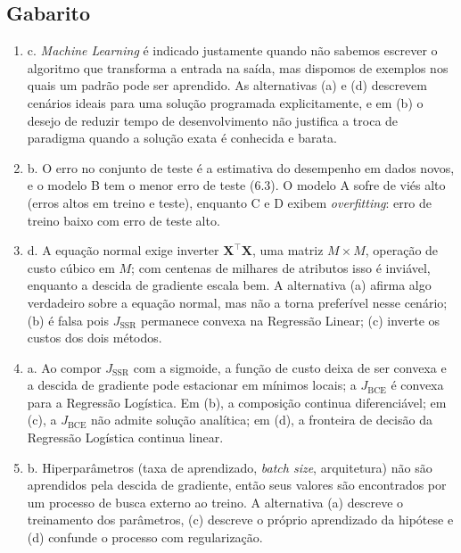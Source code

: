 \documentclass{dlproblemset}
\begin{document}
\subsection*{Gabarito}
\color{blue}
\begin{enumerate}[1)]

    \item c. \textit{Machine Learning} é indicado justamente quando não sabemos escrever o algoritmo que transforma a entrada na saída, mas dispomos de exemplos nos quais um padrão pode ser aprendido. As alternativas (a) e (d) descrevem cenários ideais para uma solução programada explicitamente, e em (b) o desejo de reduzir tempo de desenvolvimento não justifica a troca de paradigma quando a solução exata é conhecida e barata.

    \item b. O erro no conjunto de teste é a estimativa do desempenho em dados novos, e o modelo B tem o menor erro de teste ($6.3$). O modelo A sofre de viés alto (erros altos em treino e teste), enquanto C e D exibem \textit{overfitting}: erro de treino baixo com erro de teste alto.

    \item d. A equação normal exige inverter $\mathbf{X}^\top\mathbf{X}$, uma matriz $M \times M$, operação de custo cúbico em $M$; com centenas de milhares de atributos isso é inviável, enquanto a descida de gradiente escala bem. A alternativa (a) afirma algo verdadeiro sobre a equação normal, mas não a torna preferível nesse cenário; (b) é falsa pois $J_{\text{SSR}}$ permanece convexa na Regressão Linear; (c) inverte os custos dos dois métodos.

    \item a. Ao compor $J_{\text{SSR}}$ com a sigmoide, a função de custo deixa de ser convexa e a descida de gradiente pode estacionar em mínimos locais; a $J_{\text{BCE}}$ é convexa para a Regressão Logística. Em (b), a composição continua diferenciável; em (c), a $J_{\text{BCE}}$ não admite solução analítica; em (d), a fronteira de decisão da Regressão Logística continua linear.

    \item b. Hiperparâmetros (taxa de aprendizado, \textit{batch size}, arquitetura) não são aprendidos pela descida de gradiente, então seus valores são encontrados por um processo de busca externo ao treino. A alternativa (a) descreve o treinamento dos parâmetros, (c) descreve o próprio aprendizado da hipótese e (d) confunde o processo com regularização.


\end{enumerate}
\end{document}
